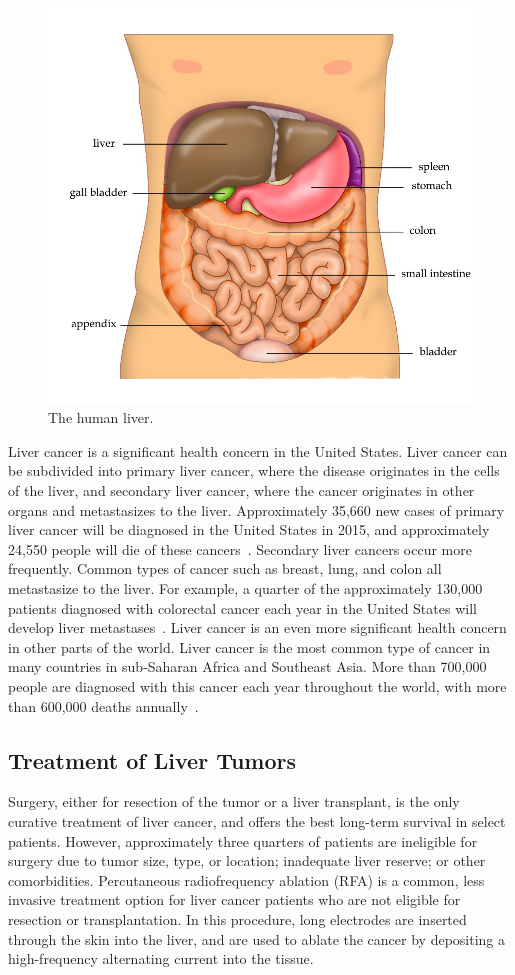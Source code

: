 \begin{figure}[!ht]
\centering
\includegraphics[width = 0.75\columnwidth]{./Images/Chapter1/liverIllustration.jpg}%
\caption{The human liver.}
\label{fig:Ch1LiverAnatomy}
\end{figure}    

Liver cancer is a significant health concern in the United States. Liver cancer can be subdivided into primary liver cancer, where the disease originates in the cells of the liver, and secondary liver cancer, where the cancer originates in other organs and metastasizes to the liver. Approximately 35,660 new cases of primary liver cancer will be diagnosed in the United States in 2015, and approximately 24,550 people will die of these cancers~\cite{AmericanCancer2015}. Secondary liver cancers occur more frequently. Common types of cancer such as breast, lung, and colon all metastasize to the liver. For example, a quarter of the approximately 130,000 patients diagnosed with colorectal cancer each year in the United States will develop liver metastases~\cite{Ananthakrishnan2006,CDC2015,Haddad2011}. Liver cancer is an even more significant health concern in other parts of the world. Liver cancer is the most common type of cancer in many countries in sub-Saharan Africa and Southeast Asia. More than 700,000 people are diagnosed with this cancer each year throughout the world, with more than 600,000 deaths annually~\cite{AmericanCancer2015}.

\subsection{Treatment of Liver Tumors}
Surgery, either for resection of the tumor or a liver transplant, is the only curative treatment of liver cancer, and offers the best long-term survival in select patients. However, approximately three quarters of patients are ineligible for surgery due to tumor size, type, or location; inadequate liver reserve; or other comorbidities. Percutaneous radiofrequency ablation (RFA) is a common, less invasive treatment option for liver cancer patients who are not eligible for resection or transplantation. In this procedure, long electrodes are inserted through the skin into the liver, and are used to ablate the cancer by depositing a high-frequency alternating current into the tissue. 


